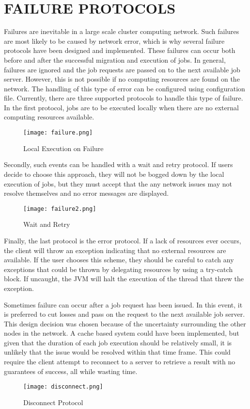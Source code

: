 \section{FAILURE PROTOCOLS}\label{sec:conclusions}

Failures are inevitable in a large scale cluster computing network.
Such failures are most likely to be caused by network error, which
is why several failure protocols have been designed and implemented.
These failures can occur both before and after the successful
migration and execution of jobs.
In general, failures are ignored and the job requests are passed
on to the next available job server.
However, this is not possible if no computing resources are
found on the network.
The handling of this type of error can be configured
using configuration file.
Currently, there are three supported protocols to handle
this type of failure.
In the first protocol, jobs are to be executed locally when
there are no external computing resources available.

\begin{figure}[H]
    \centering
    \texttt{[image: failure.png]}
    \caption{Local Execution on Failure}
\end{figure}

Secondly, such events can be handled with a wait and retry protocol.
If users decide to choose this approach, they will not be bogged down
by the local execution of jobs, but they must accept that the any network
issues may not resolve themselves and no error messages are displayed.

\begin{figure}[H]
    \centering
    \texttt{[image: failure2.png]}
    \caption{Wait and Retry}
\end{figure}

Finally, the last protocol is the error protocol.
If a lack of resources ever occurs, the client will
throw an exception indicating that no external resources
are available.
If the user chooses this scheme, they should be careful
to catch any exceptions that could be thrown by delegating
resources by using a try-catch block.
If uncaught, the JVM will halt the execution of the thread
that threw the exception.

Sometimes failure can occur after a job request has been issued.
In this event, it is preferred to cut losses and pass on the request
to the next available job server.
This design decision was chosen because of the uncertainty surrounding
the other nodes in the network.
A cache based system could have been implemented, but given that the duration
of each job execution should be relatively small, it is unlikely that the issue
would be resolved within that time frame.
This could require the client attempt to reconnect to a server to retrieve
a result with no guarantees of success, all while wasting time.

\begin{figure}[H]
    \centering
    \texttt{[image: disconnect.png]}
    \caption{Disconnect Protocol}
\end{figure}

